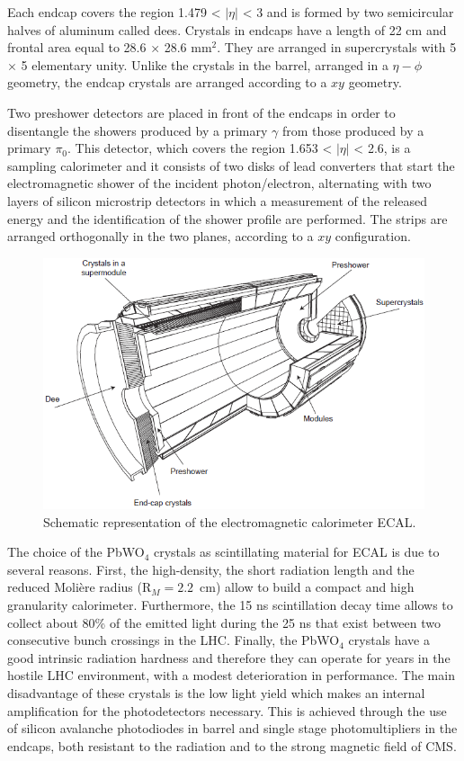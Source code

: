Each endcap covers the region 1.479 < $|\eta|$ < 3 and is formed by two semicircular halves
of aluminum called dees. Crystals in endcaps have a length of 22 cm and frontal area
equal to 28.6 × 28.6 mm$^2$. They are arranged in supercrystals with 5 $\times$ 5 elementary unity.
Unlike the crystals in the barrel, arranged in a $\eta - \phi $ geometry, the endcap crystals are
arranged according to a $xy$ geometry.

Two preshower detectors are placed in front of the endcaps in order to disentangle the
showers produced by a primary $\gamma$ from those produced by a primary $\pi_0$. This detector,
which covers the region 1.653 <  $|\eta|$ < 2.6, is a sampling calorimeter and it consists of two
disks of lead converters  that start the electromagnetic
shower of the incident photon/electron, alternating with two layers of silicon microstrip
detectors in which a measurement of the released energy and the identification of the
shower profile are performed. The strips are arranged orthogonally in the two planes,
according to a $xy$ configuration.
\begin{figure}
\centering
\includegraphics[scale= 0.5]{../Cap2/ecal_all}
\caption{Schematic representation of the electromagnetic calorimeter ECAL.}
\label{ecal_all}
\end{figure}

The choice of the PbWO$_4$ crystals as scintillating material for ECAL is due to several
reasons. First, the high-density, the short radiation length  and the
reduced Molière radius (R$_M = 2.2$~cm) allow to build a compact and
high granularity calorimeter. Furthermore, the 15 ns scintillation
decay time allows to collect about 80\% of the emitted light during
the 25 ns that exist between two consecutive bunch crossings in the
LHC. Finally, the PbWO$_4$ crystals have a 
good intrinsic radiation hardness and therefore they can operate for years in the hostile
LHC environment, with a modest deterioration in performance. The main disadvantage
of these crystals is the low light yield  which makes an internal
amplification for the photodetectors necessary. This is achieved through the use of silicon
avalanche photodiodes  in barrel and single stage photomultipliers  in the endcaps, both resistant to the radiation and to the strong
magnetic field of CMS.

